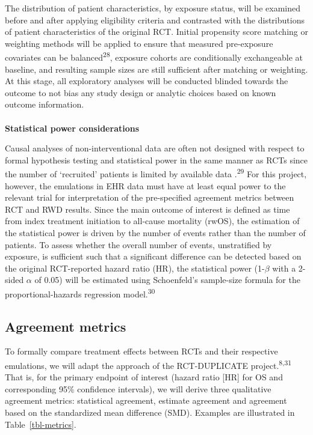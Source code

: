 \documentclass[
  letterpaper,
  DIV=11,
  numbers=noendperiod]{scrartcl}
\makeatletter
\let\oldparagraph\paragraph
\renewcommand{\paragraph}{
    \@ifstar
      \xxxParagraphStar
      \xxxParagraphNoStar
  }
\newcommand{\xxxParagraphStar}[1]{\oldparagraph*{#1}\mbox{}}
\newcommand{\xxxParagraphNoStar}[1]{\oldparagraph{#1}\mbox{}}
\makeatother
\begin{document}
The distribution of patient characteristics, by exposure status, will be
examined before and after applying eligibility criteria and contrasted
with the distributions of patient characteristics of the original RCT.
Initial propensity score matching or weighting methods will be applied
to ensure that measured pre-exposure covariates can be
balanced\textsuperscript{28}, exposure cohorts are conditionally
exchangeable at baseline, and resulting sample sizes are still
sufficient after matching or weighting. At this stage, all exploratory
analyses will be conducted blinded towards the outcome to not bias any
study design or analytic choices based on known outcome information.

\paragraph{\texorpdfstring{\textbf{Statistical power
considerations}}{Statistical power considerations}}\label{statistical-power-considerations}

Causal analyses of non-interventional data are often not designed with
respect to formal hypothesis testing and statistical power in the same
manner as RCTs since the number of `recruited' patients is limited by
available data .\textsuperscript{29} For this project, however, the
emulations in EHR data must have at least equal power to the relevant
trial for interpretation of the pre-specified agreement metrics between
RCT and RWD results. Since the main outcome of interest is defined as
time from index treatment initiation to all-cause mortality (rwOS), the
estimation of the statistical power is driven by the number of events
rather than the number of patients. To assess whether the overall number
of events, unstratified by exposure, is sufficient such that a
significant difference can be detected based on the original
RCT-reported hazard ratio (HR), the statistical power (1-\(\beta\) with
a 2-sided \(\alpha\) of 0.05) will be estimated using Schoenfeld's
sample-size formula for the proportional-hazards regression
model.\textsuperscript{30}

\subsection{Agreement metrics}\label{sec-agreement-metrics}

To formally compare treatment effects between RCTs and their respective
emulations, we will adapt the approach of the RCT-DUPLICATE
project.\textsuperscript{8,31} That is, for the primary endpoint of
interest (hazard ratio {[}HR{]} for OS and corresponding 95\% confidence
intervals), we will derive three qualitative agreement metrics:
statistical agreement, estimate agreement and agreement based on the
standardized mean difference (SMD). Examples are illustrated in
Table~\ref{tbl-metrics}.
\end{document}
